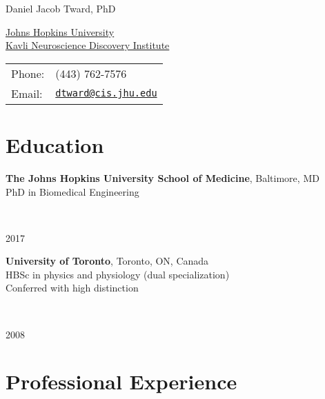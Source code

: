 \documentclass[letterpaper,11pt]{article}
\def\name{Daniel Jacob Tward, PhD}
\begin{document}
{\huge \name}


\vspace{0.25in}


\begin{minipage}{0.45\linewidth}
  \href{http://www.jhu.edu/}{Johns Hopkins University} \\
  \href{http://kavlijhu.org}{Kavli Neuroscience Discovery Institute}%
\end{minipage}
\begin{minipage}{0.45\linewidth}
  \begin{tabular}{ll}
    Phone: & (443) 762-7576\\
    Email: & \href{mailto:dtward@cis.jhu.edu}{\tt dtward@cis.jhu.edu} \\
  \end{tabular}
\end{minipage}


\newcommand{\dancol}[2]{%
\begin{minipage}{5.9in}%
#1 %
\end{minipage}~%
\begin{minipage}{0.6in}%
\hfill%
#2%
\end{minipage}%
\vspace{1em}%
}



\section*{Education}


\dancol{\textbf{The Johns Hopkins University School of Medicine}, Baltimore, MD\\
PhD in Biomedical Engineering}{2017}

\dancol{\textbf{University of Toronto}, Toronto, ON, Canada\\HBSc in physics and physiology (dual specialization)\\Conferred with high distinction}{2008}


\section*{Professional Experience}
\end{document}
